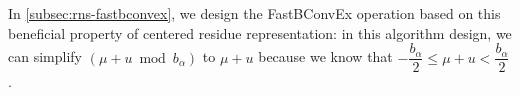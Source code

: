 In \autoref{subsec:rns-fastbconvex}, we design the \textsf{FastBConvEx} operation based on this beneficial property of centered residue representation: in this algorithm design, we can simplify $(\mu + u \bmod b_\alpha)$ to $\mu + u$ because we know that $-\dfrac{b_\alpha}{2} \leq \mu + u < \dfrac{b_\alpha}{2}$.
